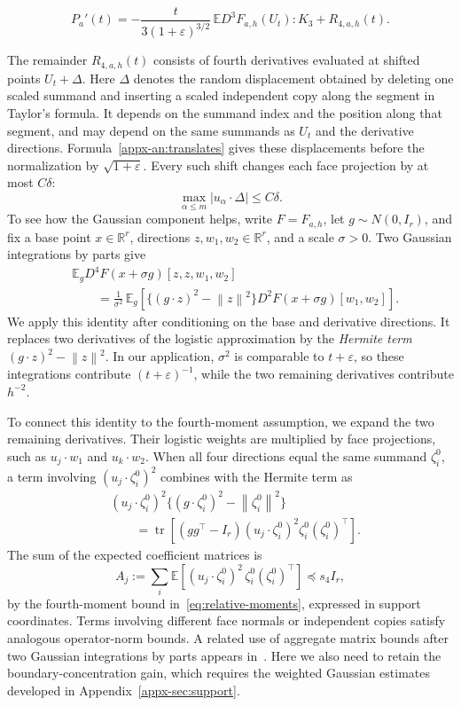 \documentclass[11pt,letterpaper,twoside,leqno]{article}
\theoremstyle{bookplain}
\theoremstyle{bookremark}
\newcommand{\E}{\mathbb E}
\newcommand{\R}{\mathbb R}
\newcommand{\tr}{\operatorname{tr}}
\newcommand{\norm}[1]{\left\lVert#1\right\rVert}
\begin{document}
\begin{equation}
 P_a'(t)=
 -\frac{t}{3(1+\varepsilon)^{3/2}}\,
       \E D^3F_{a,h}(U_t):K_3+R_{4,a,h}(t).
 \label{eq:path-summary}
\end{equation}
{
{
{
The remainder \(R_{4,a,h}(t)\) consists of fourth derivatives evaluated
at shifted points \(U_t+\Delta\). Here \(\Delta\) denotes the random
displacement obtained by deleting one scaled summand and inserting a
scaled independent copy along the segment in Taylor's formula. It
depends on the summand index and the position along that segment, and
may depend on the same summands as \(U_t\) and the derivative
directions. Formula~\eqref{appx-an:translates} gives these displacements
before the normalization by \(\sqrt{1+\varepsilon}\). Every such shift
changes each face projection by at most \(C\delta\):
\[
 \max_{\alpha\le m}|u_\alpha\cdot\Delta|\le C\delta.
\]
}
} To see how the Gaussian component helps, write \(F=F_{a,h}\),
let \(g\sim N(0,I_r)\), and fix a base point \(x\in\R^r\), directions
\(z,w_1,w_2\in\R^r\), and a scale \(\sigma>0\). Two Gaussian integrations
by parts give
\[
\begin{aligned}
 &\E_g D^4F(x+\sigma g)[z,z,w_1,w_2]\\
 &\qquad=\frac1{\sigma^2}\,
 \E_g\!\left[
 \bigl\{(g\cdot z)^2-\norm z^2\bigr\}
 D^2F(x+\sigma g)[w_1,w_2]
 \right].
\end{aligned}
\]
We apply this identity after conditioning on the base and derivative
directions. It replaces two derivatives of the logistic approximation
by the \emph{Hermite term} \((g\cdot z)^2-\norm z^2\).
In our application, \(\sigma^2\) is comparable to \(t+\varepsilon\),
so these integrations contribute \((t+\varepsilon)^{-1}\), while the
two remaining derivatives contribute \(h^{-2}\).

{
To connect this identity to the fourth-moment assumption, we expand the
 two remaining derivatives. Their logistic weights are multiplied by
 face projections, such as \(u_j\cdot w_1\) and \(u_k\cdot w_2\).
When all four directions equal the same summand \(\zeta_i^0\), a term
involving \((u_j\cdot\zeta_i^0)^2\) combines with the Hermite term as
\[
\begin{aligned}
 &(u_j\cdot\zeta_i^0)^2
 \bigl\{(g\cdot\zeta_i^0)^2-\norm{\zeta_i^0}^2\bigr\}\\
 &\qquad=\tr\!\left[
 (gg^\top-I_r)(u_j\cdot\zeta_i^0)^2
 \zeta_i^0(\zeta_i^0)^\top
 \right].
\end{aligned}
\]
The sum of the expected coefficient matrices is
\[
 A_j:=\sum_i\E\!\left[
 (u_j\cdot\zeta_i^0)^2\,
 \zeta_i^0(\zeta_i^0)^\top
 \right]\preceq s_4I_r,
\]
by the fourth-moment bound in~\eqref{eq:relative-moments}, expressed in
support coordinates. Terms involving different face normals or
independent copies satisfy analogous operator-norm bounds.
{
A related use of aggregate matrix bounds after two Gaussian
integrations by parts appears in~\cite[Lemma~16]{GaoZhang}.
Here we also need to retain the boundary-concentration gain,
which requires the weighted Gaussian estimates developed in
Appendix~\ref{appx-sec:support}.
}
}

}
\end{document}
